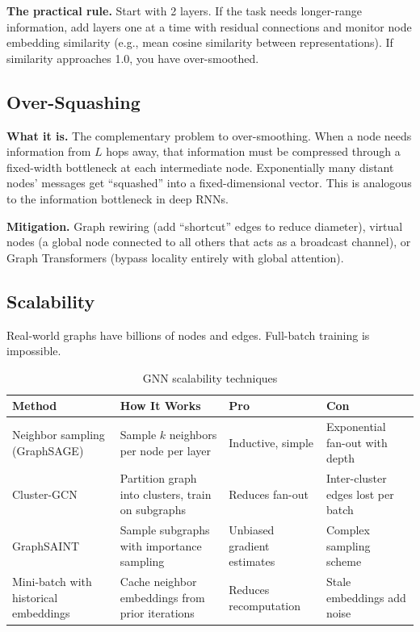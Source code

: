\textbf{The practical rule.} Start with 2 layers. If the task needs longer-range information, add layers one at a time with residual connections and monitor node embedding similarity (e.g., mean cosine similarity between representations). If similarity approaches 1.0, you have over-smoothed.

\subsection{Over-Squashing}

\textbf{What it is.} The complementary problem to over-smoothing. When a node needs information from $L$ hops away, that information must be compressed through a fixed-width bottleneck at each intermediate node. Exponentially many distant nodes' messages get ``squashed'' into a fixed-dimensional vector. This is analogous to the information bottleneck in deep RNNs.

\textbf{Mitigation.} Graph rewiring (add ``shortcut'' edges to reduce diameter), virtual nodes (a global node connected to all others that acts as a broadcast channel), or Graph Transformers (bypass locality entirely with global attention).

\subsection{Scalability}

Real-world graphs have billions of nodes and edges. Full-batch training is impossible.

\begin{table}[H]
\centering
\caption{GNN scalability techniques}
\begin{tabularx}{\textwidth}{lXXX}
\toprule
\textbf{Method} & \textbf{How It Works} & \textbf{Pro} & \textbf{Con} \\
\midrule
Neighbor sampling (GraphSAGE) & Sample $k$ neighbors per node per layer & Inductive, simple & Exponential fan-out with depth \\
Cluster-GCN & Partition graph into clusters, train on subgraphs & Reduces fan-out & Inter-cluster edges lost per batch \\
GraphSAINT & Sample subgraphs with importance sampling & Unbiased gradient estimates & Complex sampling scheme \\
Mini-batch with historical embeddings & Cache neighbor embeddings from prior iterations & Reduces recomputation & Stale embeddings add noise \\
\bottomrule
\end{tabularx}
\end{table}

